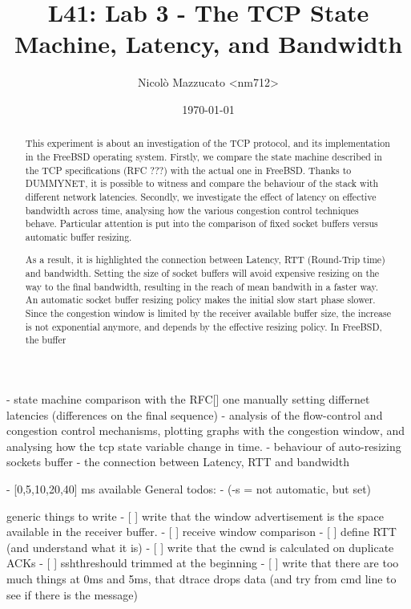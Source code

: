 \documentclass[a4paper,10pt]{article}
\begin{document}
\title{L41: Lab 3 - The TCP State Machine, Latency, and Bandwidth}
\author{Nicolò Mazzucato \textless{}nm712\textgreater{}}
\date{\today}

\maketitle

\thispagestyle{empty}

\begin{abstract}           
   This experiment is about an investigation of the TCP protocol, and its
   implementation in the FreeBSD operating system. Firstly, we compare the state machine described
   in the TCP specifications (RFC ???) with the actual one in FreeBSD. Thanks
   to DUMMYNET, it is possible to witness and compare the behaviour of the
   stack with different network latencies. Secondly, we investigate the effect
   of latency on effective bandwidth across time, analysing how the various
   congestion control techniques behave. Particular attention is put into the
   comparison of fixed socket buffers versus automatic buffer resizing.

   As a result, it is highlighted the connection between Latency, RTT (Round-Trip time) and bandwidth. 
   Setting the size of socket buffers will avoid expensive resizing on the way to the final bandwidth, resulting in the reach of mean bandwith in a faster way. An automatic socket buffer resizing policy makes the initial slow start phase slower. Since the congestion window is limited by the receiver available buffer size, the increase is not exponential anymore, and depends by the effective resizing policy. In FreeBSD, the buffer %


 
\end{abstract}

\iffalse
- state machine comparison with the RFC[] one manually setting differnet latencies (differences on the final sequence)
   - analysis of the flow-control and congestion control mechanisms, plotting graphs with the congestion window, and analysing how the tcp state variable change in time.
   - behaviour of auto-resizing sockets buffer
   - the connection between Latency, RTT and bandwidth

- [0,5,10,20,40] ms available
General todos:
- (-s = not automatic, but set)

generic things to write
- [ ] write that the window advertisement is the space available in the receiver buffer.
- [ ] receive window comparison
- [ ] define RTT (and understand what it is)
- [ ] write that the cwnd is calculated on duplicate ACKs
- [ ] sshthreshould trimmed at the beginning
- [ ] write that there are too much things at 0ms and 5ms, that dtrace drops data (and try from cmd line to see if there is the message)
\end{document}
